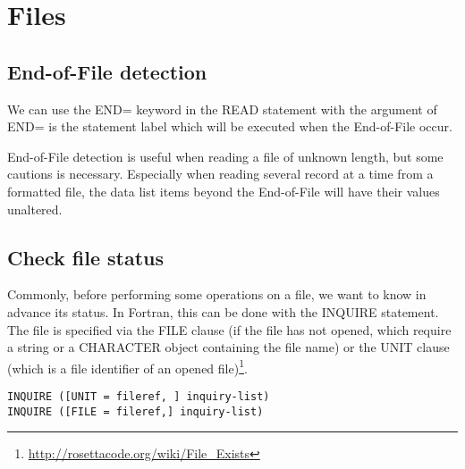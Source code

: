 
\chapter{Files}
\label{chap:files}










\section{End-of-File detection}
\label{sec:end-file-detection}

We can use the END= keyword in the READ statement with the argument of
END= is the statement label which will be executed when the
End-of-File occur.

End-of-File detection is useful when reading a file of unknown length,
but some cautions is necessary. Especially when reading several record
at a time from a formatted file, the data list items beyond the
End-of-File will have their values unaltered. 


\section{Check file status}
\label{sec:check-file-status}

Commonly, before performing some operations on a file, we want to know
in advance its status. In Fortran, this can be done with the INQUIRE
statement. The file is specified via the FILE clause (if the file has
not opened, which require a string or a CHARACTER object containing
the file name) or the UNIT clause (which is a file identifier of an
opened file)\footnote{\url{http://rosettacode.org/wiki/File_Exists}}.

\begin{verbatim}
INQUIRE ([UNIT = fileref, ] inquiry-list)
INQUIRE ([FILE = fileref,] inquiry-list)
\end{verbatim}

